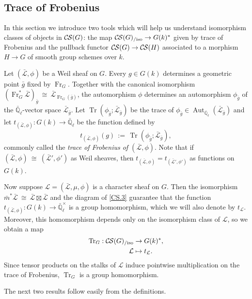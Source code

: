 \documentclass[10pt]{amsart}
\theoremstyle{plain}
\theoremstyle{definition}
\newcommand{\EE}{\mathbb{\bar Q}_\ell}
\newcommand{\Fq}{k}
\newcommand{\EEx}{\EE^\times}
\newcommand{\Frob}[1]{\operatorname{Fr}_{#1}}
\DeclareMathOperator{\Aut}{Aut}
\DeclareMathOperator{\trace}{Tr}
\newcommand{\ceq}{{\, :=\, }}
\newcommand{\iso}{{\ \cong\ }}
\newcommand{\trFrob}[1]{t_{#1}}
\newcommand{\TrFrob}[1]{\operatorname{Tr}_{#1}}
\newcommand{\cs}[1]{{\mathcal{#1}}}
\newcommand{\gcs}[1]{{\mathcal{\bar #1}}}
\newcommand{\CS}{{\mathcal{C\hskip-0.8pt S}}}
\newcommand{\CSiso}[1]{\CS(#1)_{/\text{iso}}}
\newcommand{\bg}{{\bar{g}}}
\newcommand{\bm}{\bar{m}}
\begin{document}
\subsection{Trace of Frobenius}\label{ssec:Frob}

In this section we introduce two tools which will help us understand isomorphism classes of objects in $\CS(G)$:
the map $\CSiso{G} \to G(k)^*$ given by trace of Frobenius and the pullback functor $\CS(G) \to \CS(H)$
associated to a morphism $H \to G$ of smooth group schemes over $\Fq$.

Let $(\gcs{L},\phi)$ be a Weil sheaf on $G$. Every $g\in G(\Fq)$
determines a geometric point $\bg$ fixed by $\Frob{G}$. 
Together with the canonical isomorphism $(\Frob{G}^*\gcs{L})_{\bg} \iso  \gcs{L}_{\Frob{G}(\bg)}$,
the automorphism $\phi$ determines an automorphism $\phi_{\bg}$ of the $\EE$-vector space $\gcs{L}_{\bg}$.
Let $\trace(\phi_{\bg};\gcs{L}_{\bg})$ be the trace of $\phi_{\bg} \in \Aut_{\EE}(\gcs{L}_{\bg})$ and let
$\trFrob{(\gcs{L},\phi)} : G(\Fq)\to \EE$ be the function defined by 
\begin{equation}\label{trWeil}
\trFrob{(\gcs{L},\phi)}(g) \ceq \trace(\phi_{\bg};\gcs{L}_{\bg}),
\end{equation}
commonly called the {\em trace of Frobenius of $(\gcs{L},\phi)$}.
Note that if $(\gcs{L},\phi) \iso (\gcs{L'},\phi')$ as Weil sheaves, 
then $\trFrob{(\gcs{L},\phi)} = \trFrob{(\gcs{L'},\phi')}$ as functions on $G(\Fq)$.

Now suppose $\cs{L} = (\gcs{L},\mu,\phi)$ is a character sheaf on $G$.
Then the isomorphism $\bm^* \gcs{L} \iso \gcs{L} \boxtimes\gcs{L}$ and the diagram of
\ref{CS.3} guarantee
that the function $\trFrob{(\gcs{L},\phi)} : G(\Fq)\to \EEx$ is a group homomorphism, which we will also denote by $\trFrob{\cs{L}}$.
Moreover, this homomorphism depends only on the isomorphism class of $\cs{L}$, so we obtain a map
\begin{align*}
\TrFrob{G} : \CSiso{G} &\to G(\Fq)^*, \\
\cs{L} &\mapsto \trFrob{\cs{L}}.
\end{align*}
Since tensor products on the stalks of $\cs{L}$ induce pointwise multiplication on the trace of Frobenius, $\TrFrob{G}$ is a group homomorphism.  

The next two results follow easily from the definitions.
\end{document}
